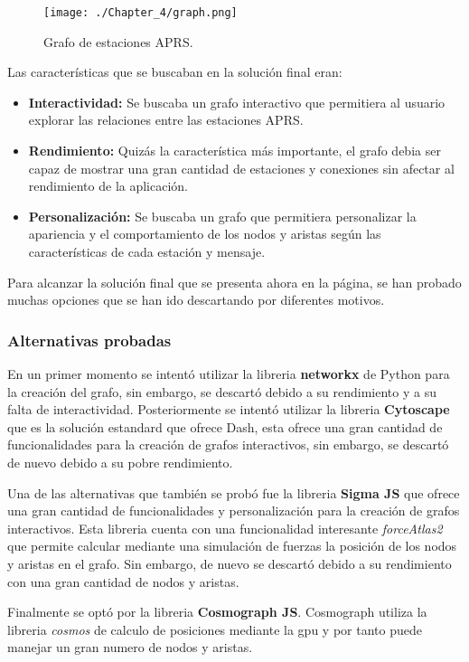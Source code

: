 \begin{figure}[h]
	\centering
	\texttt{[image: ./Chapter\_4/graph.png]}
	\caption{Grafo de estaciones APRS.}
	\label{fig:graph}
\end{figure}

Las características que se buscaban en la solución final eran:

\begin{itemize}
	\item \textbf{Interactividad:} Se buscaba un grafo interactivo que permitiera al usuario explorar las relaciones entre las estaciones APRS.
	\item \textbf{Rendimiento:} Quizás la característica más importante, el grafo debia ser capaz de mostrar una gran cantidad de estaciones y conexiones sin afectar al rendimiento de la aplicación.
	\item \textbf{Personalización:} Se buscaba un grafo que permitiera personalizar la apariencia y el comportamiento de los nodos y aristas según las características de cada estación y mensaje.
\end{itemize}
Para alcanzar la solución final que se presenta ahora en la página, se han probado muchas opciones que se han ido descartando por diferentes motivos. 
\subsubsection{Alternativas probadas}
En un primer momento se intentó utilizar la libreria \textbf{networkx} de Python para la creación del grafo, sin embargo, se descartó debido a su rendimiento y a su falta de interactividad. Posteriormente se intentó utilizar la libreria \textbf{Cytoscape} que es la solución estandard que ofrece Dash, esta ofrece una gran cantidad de funcionalidades para la creación de grafos interactivos, sin embargo, se descartó de nuevo debido a su pobre rendimiento. 

Una de las alternativas que también se probó fue la libreria \textbf{Sigma JS} que ofrece una gran cantidad de funcionalidades y personalización para la creación de grafos interactivos. Esta libreria cuenta con una funcionalidad interesante \textit{forceAtlas2} que permite calcular mediante una simulación de fuerzas la posición de los nodos y aristas en el grafo. Sin embargo, de nuevo se descartó debido a su rendimiento con una gran cantidad de nodos y aristas.

Finalmente se optó por la libreria \textbf{Cosmograph JS}. Cosmograph utiliza la libreria \textit{cosmos} de calculo de posiciones mediante la gpu y por tanto puede manejar un gran numero de nodos y aristas. 

